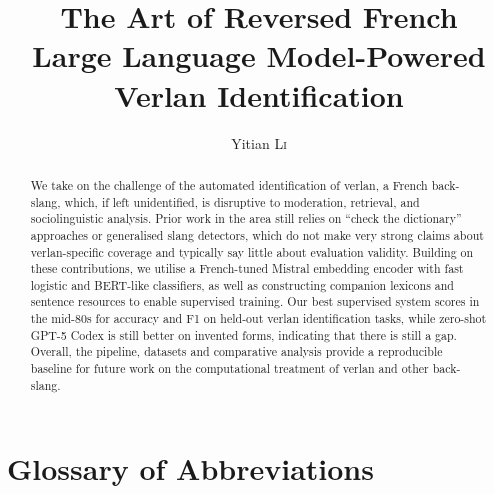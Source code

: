 \documentclass[12pt]{article}
\title{The Art of Reversed French\\\large Large Language Model-Powered Verlan Identification}
\author{Yitian \textsc{Li}}
\newcommand{\blankpage}{%
  \clearpage
  \thispagestyle{empty}
  \null
  \clearpage}
\newif\ifskipsectionclear
\begin{document}
\maketitle

\blankpage

\begin{abstract}
We take on the challenge of the automated identification of verlan, a French back-slang, which, if left unidentified, is disruptive to moderation, retrieval, and sociolinguistic analysis. Prior work in the area still relies on ``check the dictionary'' approaches or generalised slang detectors, which do not make very strong claims about verlan-specific coverage and typically say little about evaluation validity. Building on these contributions, we utilise a French-tuned Mistral embedding encoder with fast logistic and BERT-like classifiers, as well as constructing companion lexicons and sentence resources to enable supervised training. Our best supervised system scores in the mid-80s for accuracy and F1 on held-out verlan identification tasks, while zero-shot GPT-5 Codex is still better on invented forms, indicating that there is still a gap. Overall, the pipeline, datasets and comparative analysis provide a reproducible baseline for future work on the computational treatment of verlan and other back-slang.
\end{abstract}

\blankpage
\tableofcontents
\thispagestyle{empty}

\cleardoublepage
\skipsectioncleartrue
{}
\setcounter{page}{1}

\section*{Glossary of Abbreviations}
\end{document}
